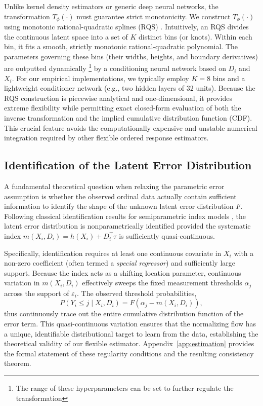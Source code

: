 \documentclass{article}
\begin{document}
Unlike kernel density estimators or generic deep neural networks, the transformation $T_\phi(\cdot)$ must guarantee strict monotonicity. We construct $T_\phi(\cdot)$ using monotonic rational-quadratic splines (RQS) \citep{Durkan2019a}. Intuitively, an RQS divides the continuous latent space into a set of $K$ distinct bins (or knots). Within each bin, it fits a smooth, strictly monotonic rational-quadratic polynomial. The parameters governing these bins (their widths, heights, and boundary derivatives) are outputted dynamically \footnote{The range of these hyperparameters can be set to further regulate the transformation} by a conditioning neural network based on $D_i$ and $X_i$. For our empirical implementations, we typically employ $K=8$ bins and a lightweight conditioner network (e.g., two hidden layers of 32 units). Because the RQS construction is piecewise analytical and one-dimensional, it provides extreme flexibility while permitting exact closed-form evaluation of both the inverse transformation and the implied cumulative distribution function (CDF). This crucial feature avoids the computationally expensive and unstable numerical integration required by other flexible ordered response estimators.

\subsection{Identification of the Latent Error Distribution}
\label{error_identification}
A fundamental theoretical question when relaxing the parametric error assumption is whether the observed ordinal data actually contain sufficient information to identify the shape of the unknown latent error distribution $F$. Following classical identification results for semiparametric index models \citep{Manski1988a, Klein1993a, Klein2002a}, the latent error distribution is nonparametrically identified provided the systematic index $m(X_i, D_i) = h(X_i) + D_i^\top\tau$ is sufficiently quasi-continuous. 

Specifically, identification requires at least one continuous covariate in $X_i$ with a non-zero coefficient (often termed a \textit{special regressor}) and sufficiently large support. Because the index acts as a shifting location parameter, continuous variation in $m(X_i, D_i)$ effectively sweeps the fixed measurement thresholds $\alpha_j$ across the support of $\varepsilon_i$. The observed threshold probabilities, 
\[
P(Y_i \le j \mid X_i, D_i) = F(\alpha_j - m(X_i, D_i)),
\]
thus continuously trace out the entire cumulative distribution function of the error term. This quasi-continuous variation ensures that the normalizing flow has a unique, identifiable distributional target to learn from the data, establishing the theoretical validity of our flexible estimator. Appendix~\ref{app:estimation} provides the formal statement of these regularity conditions and the resulting consistency theorem.
\end{document}
